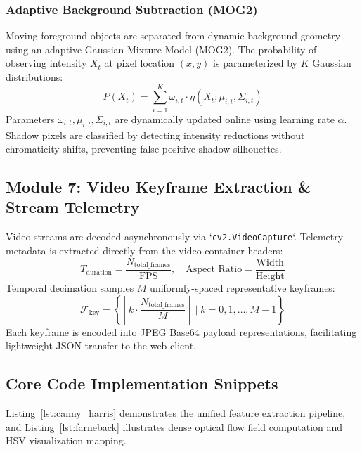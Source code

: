 \subsubsection{Adaptive Background Subtraction (MOG2)}
Moving foreground objects are separated from dynamic background geometry using an adaptive Gaussian Mixture Model (MOG2). The probability of observing intensity $X_t$ at pixel location $(x,y)$ is parameterized by $K$ Gaussian distributions:
\begin{equation}
    P(X_t) = \sum_{i=1}^K \omega_{i,t} \cdot \eta(X_t; \mu_{i,t}, \Sigma_{i,t})
\end{equation}
Parameters $\omega_{i,t}, \mu_{i,t}, \Sigma_{i,t}$ are dynamically updated online using learning rate $\alpha$. Shadow pixels are classified by detecting intensity reductions without chromaticity shifts, preventing false positive shadow silhouettes.

\subsection{Module 7: Video Keyframe Extraction \& Stream Telemetry}
Video streams are decoded asynchronously via `\texttt{cv2.VideoCapture}`. Telemetry metadata is extracted directly from the video container headers:
\begin{equation}
    T_{\text{duration}} = \frac{N_{\text{total\_frames}}}{\text{FPS}}, \quad \text{Aspect Ratio} = \frac{\text{Width}}{\text{Height}}
\end{equation}
Temporal decimation samples $M$ uniformly-spaced representative keyframes:
\begin{equation}
    \mathcal{F}_{\text{key}} = \left\{ \left\lfloor k \cdot \frac{N_{\text{total\_frames}}}{M} \right\rfloor \;\Bigg|\; k = 0, 1, \dots, M-1 \right\}
\end{equation}
Each keyframe is encoded into JPEG Base64 payload representations, facilitating lightweight JSON transfer to the web client.

\subsection{Core Code Implementation Snippets}
Listing~\ref{lst:canny_harris} demonstrates the unified feature extraction pipeline, and Listing~\ref{lst:farneback} illustrates dense optical flow field computation and HSV visualization mapping.

